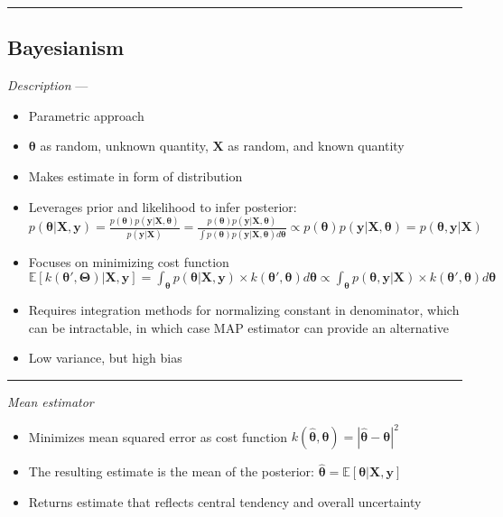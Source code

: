 {\color{black}\hrule height 0.001mm}

\subsection*{Bayesianism}
\emph{Description} --- 
\begin{itemize}
    \item Parametric approach
    \item $\boldsymbol{\theta}$ as random, unknown quantity, $\boldsymbol{X}$ as random, and known quantity
    \item Makes estimate in form of distribution
    \item Leverages prior and likelihood to infer posterior: $p(\boldsymbol{\theta}|\boldsymbol{X}, \boldsymbol{y}) = \frac{p(\boldsymbol{\theta})p(\boldsymbol{y}|\boldsymbol{X}, \boldsymbol{\theta})}{p(\boldsymbol{y}|\boldsymbol{X})} = \frac{p(\boldsymbol{\theta})p(\boldsymbol{y}|\boldsymbol{X}, \boldsymbol{\theta})}{\int p(\boldsymbol{\theta}) p(\boldsymbol{y}|\boldsymbol{X}, \boldsymbol{\theta}) d\boldsymbol{\theta}} \propto p(\boldsymbol{\theta})p(\boldsymbol{y}|\boldsymbol{X}, \boldsymbol{\theta}) = p(\boldsymbol{\theta}, \boldsymbol{y} |\boldsymbol{X})$ 
    \item Focuses on minimizing cost function $\mathbb{E}[k(\boldsymbol{\theta}',\boldsymbol{\Theta}) | \boldsymbol{X}, \boldsymbol{y}] = \int_{\boldsymbol{\theta}} p(\boldsymbol{\theta} | \boldsymbol{X}, \boldsymbol{y}) \times k(\boldsymbol{\theta}',\boldsymbol{\theta}) d\boldsymbol{\theta} \propto \int_{\boldsymbol{\theta}} p(\boldsymbol{\theta}, \boldsymbol{y} | \boldsymbol{X}) \times k(\boldsymbol{\theta}',\boldsymbol{\theta}) d\boldsymbol{\theta}$
    \item Requires integration methods for normalizing constant in denominator, which can be intractable, in which case MAP estimator can provide an alternative
    \item Low variance, but high bias 
\end{itemize}

{\color{lightgray}\hrule height 0.001mm}

\emph{Mean estimator}
\begin{itemize}
    \item Minimizes mean squared error as cost function $k(\hat{\boldsymbol{\theta}},\boldsymbol{\theta}) = | \hat{\boldsymbol{\theta}} - \boldsymbol{\theta} |^2$
    \item The resulting estimate is the mean of the posterior: $\hat{\boldsymbol{\theta}} = \mathbb{E}[ \boldsymbol{\theta} | \boldsymbol{X}, \boldsymbol{y} ]$
    \item Returns estimate that reflects central tendency and overall uncertainty
\end{itemize}

